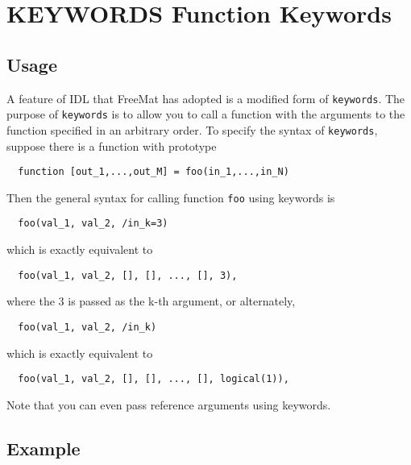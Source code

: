 \section{KEYWORDS Function Keywords}

\subsection{Usage}

A feature of IDL that FreeMat has adopted is a modified
form of \verb|keywords|.  The purpose of \verb|keywords| is to 
allow you to call a function with the arguments to the
function specified in an arbitrary order.  To specify
the syntax of \verb|keywords|, suppose there is a function 
with prototype
\begin{verbatim}
  function [out_1,...,out_M] = foo(in_1,...,in_N)
\end{verbatim}
Then the general syntax for calling function \verb|foo| using keywords
is
\begin{verbatim}
  foo(val_1, val_2, /in_k=3)
\end{verbatim}
which is exactly equivalent to
\begin{verbatim}
  foo(val_1, val_2, [], [], ..., [], 3),
\end{verbatim}
where the 3 is passed as the k-th argument, or alternately,
\begin{verbatim}
  foo(val_1, val_2, /in_k)
\end{verbatim}
which is exactly equivalent to
\begin{verbatim}
  foo(val_1, val_2, [], [], ..., [], logical(1)),
\end{verbatim}
Note that you can even pass reference arguments using keywords.
\subsection{Example}

